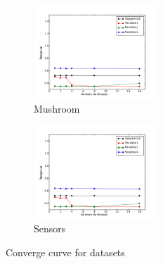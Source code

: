 \begin{figure}[H]
		\begin{subfigure}{.3\textwidth}
			\centering
			\includegraphics[height=3.5cm]{images/mushroom}
			\caption{Mushroom}
			\label{fig:mushroom}
		\end{subfigure}
		\begin{subfigure}{.3\textwidth}
			\centering
			\includegraphics[height=3.5cm]{images/sensors}
			\caption{Sensors}
			\label{fig:sensors}
		\end{subfigure}
		\caption{Converge curve for datasets}
		\label{fig:converge}
	\end{figure}